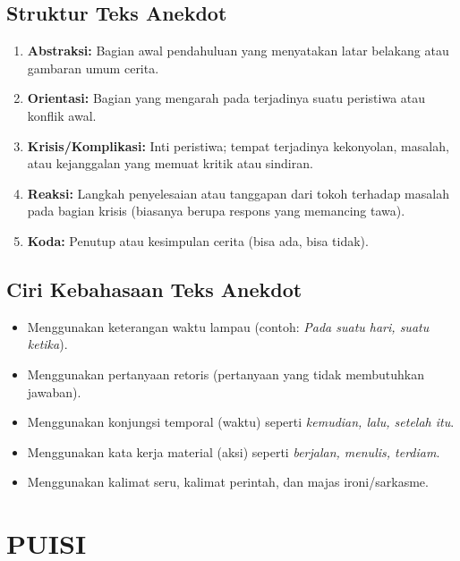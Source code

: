 \documentclass[12pt, a4paper]{article}
\begin{document}
\subsection{Struktur Teks Anekdot}
\begin{enumerate}
    \item \textbf{Abstraksi:} Bagian awal pendahuluan yang menyatakan latar belakang atau gambaran umum cerita.
    \item \textbf{Orientasi:} Bagian yang mengarah pada terjadinya suatu peristiwa atau konflik awal.
    \item \textbf{Krisis/Komplikasi:} Inti peristiwa; tempat terjadinya kekonyolan, masalah, atau kejanggalan yang memuat kritik atau sindiran.
    \item \textbf{Reaksi:} Langkah penyelesaian atau tanggapan dari tokoh terhadap masalah pada bagian krisis (biasanya berupa respons yang memancing tawa).
    \item \textbf{Koda:} Penutup atau kesimpulan cerita (bisa ada, bisa tidak).
\end{enumerate}

\subsection{Ciri Kebahasaan Teks Anekdot}
\begin{itemize}
    \item Menggunakan keterangan waktu lampau (contoh: \textit{Pada suatu hari, suatu ketika}).
    \item Menggunakan pertanyaan retoris (pertanyaan yang tidak membutuhkan jawaban).
    \item Menggunakan konjungsi temporal (waktu) seperti \textit{kemudian, lalu, setelah itu}.
    \item Menggunakan kata kerja material (aksi) seperti \textit{berjalan, menulis, terdiam}.
    \item Menggunakan kalimat seru, kalimat perintah, dan majas ironi/sarkasme.
\end{itemize}

\section{PUISI}
\end{document}
